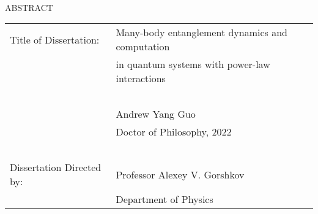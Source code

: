 \hbox{\ }

\begin{center}
\large{{ABSTRACT}}

\vspace{3em}

\end{center}
\hspace{-.15in}
\begin{tabular}{ll}
Title of Dissertation:     & {\large  Many-body entanglement dynamics and computation}\\
                           & {\large  in quantum systems with power-law interactions } \\
\                         \\
                           & {\large  Andrew Yang Guo } \\
                           & {\large Doctor of Philosophy, 2022} \\
\                         \\
Dissertation Directed by:  & {\large  Professor Alexey V. Gorshkov} \\
                           & {\large  Department of Physics } \\
\end{tabular}

\vspace{3em}

\begin{doublespacing}
\par
\end{doublespacing}
